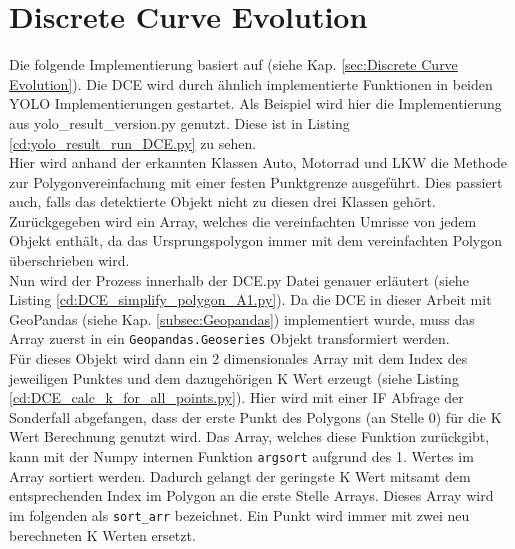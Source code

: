 \section{Discrete Curve Evolution}{
	\label{py:DCE}
	Die folgende Implementierung basiert auf \citeauthor{Barkowsky2000} \citep{Barkowsky2000} (siehe Kap. \ref{sec:Discrete Curve Evolution}). Die DCE wird durch ähnlich implementierte Funktionen in beiden YOLO Implementierungen gestartet. Als Beispiel wird hier die Implementierung aus yolo\_result\_version.py genutzt. Diese ist in Listing \ref{cd:yolo_result_run_DCE.py} zu sehen. \\
	Hier wird anhand der erkannten Klassen Auto, Motorrad und LKW die Methode zur Polygonvereinfachung mit einer festen Punktgrenze ausgeführt. Dies passiert auch, falls das detektierte Objekt nicht zu diesen drei Klassen gehört. \\ 
	
	Zurückgegeben wird ein Array, welches die vereinfachten Umrisse von jedem Objekt enthält, da das Ursprungspolygon immer mit dem vereinfachten Polygon überschrieben wird. \\

	

	Nun wird der Prozess innerhalb der DCE.py Datei genauer erläutert (siehe Listing \ref{cd:DCE_simplify_polygon_A1.py}). Da die DCE in dieser Arbeit mit GeoPandas (siehe Kap. \ref{subsec:Geopandas}) implementiert wurde, muss das Array zuerst in ein \lstinline|Geopandas.Geoseries| Objekt transformiert werden. \\
	Für dieses Objekt wird dann ein 2 dimensionales Array mit dem Index des jeweiligen Punktes und dem dazugehörigen K Wert erzeugt (siehe Listing \ref{cd:DCE_calc_k_for_all_points.py}). Hier wird mit einer IF Abfrage der Sonderfall abgefangen, dass der erste Punkt des Polygons (an Stelle 0) für die K Wert Berechnung genutzt wird.
	Das Array, welches diese Funktion zurückgibt, kann mit der Numpy internen Funktion \lstinline|argsort| aufgrund des 1. Wertes im Array sortiert werden. Dadurch gelangt der geringste K Wert mitsamt dem entsprechenden Index im Polygon an die erste Stelle Arrays. Dieses Array wird im folgenden als \lstinline|sort_arr| bezeichnet. Ein Punkt wird immer mit zwei neu berechneten K Werten ersetzt. \\

}
